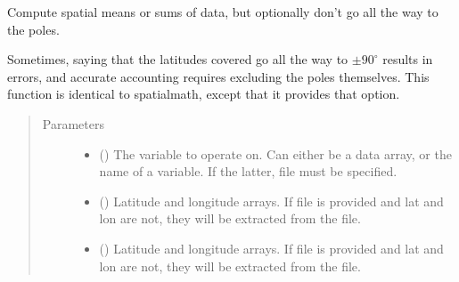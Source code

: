 \documentclass[letterpaper,10pt,english]{sphinxmanual}
\begin{document}
\begin{fulllineitems}
\label{\detokenize{source/exoplasim:exoplasim.gcmt.cspatialmath}}
Compute spatial means or sums of data, but optionally don’t go all the way to the poles.

Sometimes, saying that the latitudes covered go all the way to \(\pm90^\circ\) results in
errors, and accurate accounting requires excluding the poles themselves. This function
is identical to spatialmath, except that it provides that option.
\begin{quote}\begin{description}
\item[{Parameters}] \leavevmode\begin{itemize}
\item {} 
 (\sphinxstyleliteralemphasis{\sphinxupquote{, }}) \textendash{} The variable to operate on. Can either be a data array, or the name of a variable. If the latter, file must be specified.

\item {} 
 (\sphinxstyleliteralemphasis{\sphinxupquote{, }}) \textendash{} Latitude and longitude arrays. If file is provided and lat and lon are not, they will be
extracted from the file.

\item {} 
 (\sphinxstyleliteralemphasis{\sphinxupquote{, }}) \textendash{} Latitude and longitude arrays. If file is provided and lat and lon are not, they will be
extracted from the file.


\end{itemize}
\end{description}
\end{quote}
\end{fulllineitems}
\end{document}
